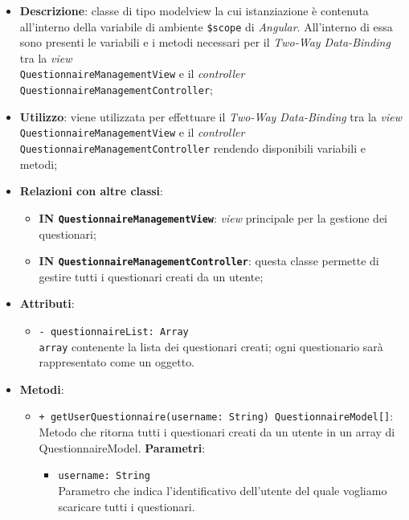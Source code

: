 	\begin{itemize}
		\item \textbf{Descrizione}: classe di tipo modelview la cui istanziazione è contenuta all'interno della variabile di ambiente \texttt{\$scope} di \textit{Angular}. All'interno di essa sono presenti le variabili e i metodi necessari per il \textit{Two-Way Data-Binding} tra la \textit{view} \\\texttt{QuestionnaireManagementView} e il \textit{controller} \texttt{QuestionnaireManagementController};
		\item \textbf{Utilizzo}: viene utilizzata per effettuare il \textit{Two-Way Data-Binding} tra la \textit{view} \texttt{QuestionnaireManagementView} e il \textit{controller} \texttt{QuestionnaireManagementController} rendendo disponibili variabili e metodi;
		\item \textbf{Relazioni con altre classi}: 
		\begin{itemize}
			\item \textbf{IN \texttt{QuestionnaireManagementView}}: \textit{view} principale per la gestione dei questionari; 
			\item \textbf{IN \texttt{QuestionnaireManagementController}}: questa classe permette di gestire tutti i questionari creati da un utente;
		\end{itemize}
		\item \textbf{Attributi}: 
		\begin{itemize}
			\item \texttt{- questionnaireList: Array} \\ \texttt{array} contenente la lista dei questionari creati; ogni questionario sarà rappresentato come un oggetto.
		\end{itemize}
		\item \textbf{Metodi}:
		\begin{itemize}
				\item \texttt{+ getUserQuestionnaire(username: String) QuestionnaireModel[]}: \\Metodo che ritorna tutti i questionari creati da un utente in un array di QuestionnaireModel.
				\textbf{Parametri}:
				\begin{itemize}
					\item \texttt{username: String}\\ 
					Parametro che indica l'identificativo dell'utente del quale vogliamo scaricare tutti i questionari.
				\end{itemize}
		\end{itemize} 
	\end{itemize}
	
	